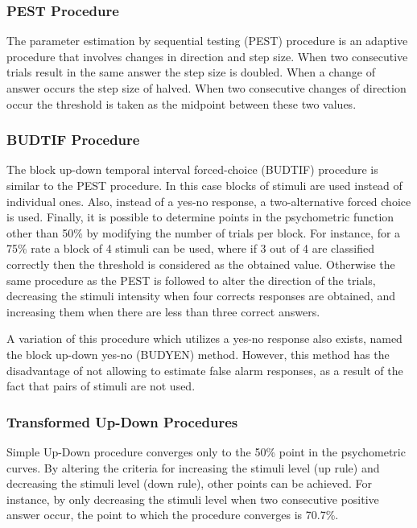 \subsubsection{PEST Procedure}

The parameter estimation by sequential testing (PEST) procedure is an adaptive
procedure that involves changes in direction and step size. When two consecutive
trials result in the same answer the step size is doubled. When a change of
answer occurs the step size of halved. When two consecutive changes of direction
occur the threshold is taken as the midpoint between these two values.

\subsubsection{BUDTIF Procedure}

The block up-down temporal interval forced-choice (BUDTIF) procedure is similar
to the PEST procedure. In this case blocks of stimuli are used instead of
individual ones. Also, instead of a yes-no response, a two-alternative forced
choice is used. Finally, it is possible to determine points in the psychometric
function other than 50\% by modifying the number of trials per block. For
instance, for a 75\% rate a block of 4 stimuli can be used, where if 3 out of 4
are classified correctly then the threshold is considered as the obtained value.
Otherwise the same procedure as the PEST is followed to alter the direction of
the trials, decreasing the stimuli intensity when four corrects responses are
obtained, and increasing them when there are less than three correct answers.

A variation of this procedure which utilizes a yes-no response also exists,
named the block up-down yes-no (BUDYEN) method. However, this method has the
disadvantage of not allowing to estimate false alarm responses, as a result of
the fact that pairs of stimuli are not used.

\subsubsection{Transformed Up-Down Procedures}

Simple Up-Down procedure converges only to the 50\% point in the psychometric
curves. By altering the criteria for increasing the stimuli level (up rule) and
decreasing the stimuli level (down rule), other points can be achieved. For
instance, by only decreasing the stimuli level when two consecutive positive
answer occur, the point to which the procedure converges is 70.7\%.

